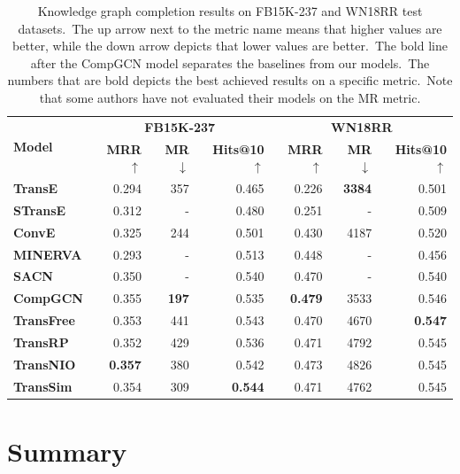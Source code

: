 \documentclass[longabstract, english, mgr]{iithesis}
\newcommand\numberedchapter[1]{\setlength\topskip{3cm}\chapter{#1}\setlength\topskip{0cm}}
\theoremstyle{default_theorem_style}\newtheorem{theorem}{Theorem}
\theoremstyle{default_theorem_style}\newtheorem{definition}{Definition}
\begin{document}
\begin{table}[!t]
\centering
\def\arraystretch{1.1}
\begin{tabular}{|l || r | r | r || r | r | r |}
 \hline
 \multirow{2}{*}{\textbf{Model}} & \multicolumn{3}{c||}{\textbf{FB15K-237}} & \multicolumn{3}{c|}{\textbf{WN18RR}} \\
 \cline{2-7}
 & \textbf{MRR} $\uparrow$ & \textbf{MR} $\downarrow$ & \textbf{Hits@10} $\uparrow$ & \textbf{MRR} $\uparrow$ &
 \textbf{MR} $\downarrow$ & \textbf{Hits@10} $\uparrow$ \\
 \Xhline{5\arrayrulewidth}
 \textbf{TransE} & 0.294 & 357 & 0.465 & 0.226 & \textbf{3384} & 0.501 \\
 \hline
 \textbf{STransE} & 0.312 & - & 0.480 & 0.251 & - & 0.509 \\
 \hline
 \textbf{ConvE} & 0.325 & 244 & 0.501 & 0.430 & 4187 & 0.520 \\
 \hline
 \textbf{MINERVA} & 0.293 & - & 0.513 & 0.448 & - & 0.456 \\
 \hline
 \textbf{SACN} & 0.350 & - & 0.540 & 0.470 & - & 0.540 \\
 \hline
 \textbf{CompGCN} & 0.355 & \textbf{197} & 0.535 & \textbf{0.479} & 3533 & 0.546 \\
 \Xhline{3\arrayrulewidth}
 \textbf{TransFree} & 0.353 & 441 & 0.543 & 0.470 & 4670 & \textbf{0.547} \\
 \hline
 \textbf{TransRP} & 0.352 & 429 & 0.536 & 0.471 & 4792 & 0.545 \\
 \hline
 \textbf{TransNIO} & \textbf{0.357} & 380 & 0.542 & 0.473 & 4826 & 0.545 \\
 \hline
 \textbf{TransSim} & 0.354 & 309 & \textbf{0.544} & 0.471 & 4762 & 0.545 \\
 \hline
\end{tabular}
\caption{Knowledge graph completion results on FB15K-237 and WN18RR test datasets.\ The up arrow next to the metric
name means that higher values are better, while the down arrow depicts that lower values are better.\ The bold line
after the CompGCN model separates the baselines from our models.\ The numbers that are bold depicts the best achieved
results on a specific metric.\ Note that some authors have not evaluated their models on the MR metric.}
\label{tab:full_results}
\end{table}

\numberedchapter{Summary}
\end{document}
